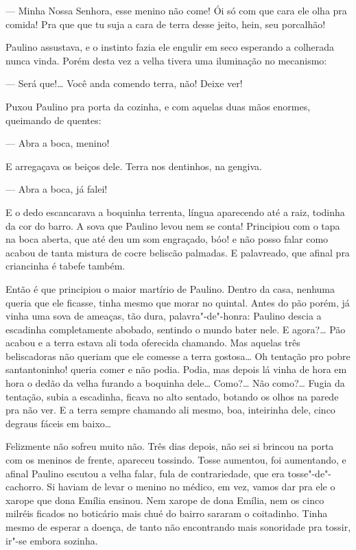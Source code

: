 --- Minha Nossa Senhora, esse menino não come! Ói só com que cara ele
olha pra comida! Pra que que tu suja a cara de terra desse jeito, hein,
seu porcalhão!

Paulino assustava, e o instinto fazia ele engulir em seco esperando a
colherada nunca vinda. Porém desta vez a velha tivera uma iluminação no
mecanismo:

--- Será que!\ldots{} Você anda comendo terra, não! Deixe ver!

Puxou Paulino pra porta da cozinha, e com aquelas duas mãos enormes,
queimando de quentes:

--- Abra a boca, menino!

E arregaçava os beiços dele. Terra nos dentinhos, na gengiva.

--- Abra a boca, já falei!

E o dedo escancarava a boquinha terrenta, língua aparecendo até a raiz,
todinha da cor do barro. A sova que Paulino levou nem se conta!
Principiou com o tapa na boca aberta, que até deu um som engraçado, bóo!
e não posso falar como acabou de tanta mistura de cocre beliscão
palmadas. E palavreado, que afinal pra criancinha é tabefe também.

Então é que principiou o maior martírio de Paulino. Dentro da casa,
nenhuma queria que ele ficasse, tinha mesmo que morar no quintal. Antes
do pão porém, já vinha uma sova de ameaças, tão dura, palavra"-de"-honra:
Paulino descia a escadinha completamente abobado, sentindo o mundo bater
nele. E agora?\ldots{} Pão acabou e a terra estava ali toda oferecida
chamando. Mas aquelas três beliscadoras não queriam que ele comesse a
terra gostosa\ldots{} Oh tentação pro pobre santantoninho! queria comer e não
podia. Podia, mas depois lá vinha de hora em hora o dedão da velha
furando a boquinha dele\ldots{} Como?\ldots{} Não como?\ldots{} Fugia da tentação,
subia a escadinha, ficava no alto sentado, botando os olhos na parede
pra não ver. E a terra sempre chamando ali mesmo, boa, inteirinha dele,
cinco degraus fáceis em baixo\ldots{}

Felizmente não sofreu muito não. Três dias depois, não sei si brincou na
porta com os meninos de frente, apareceu tossindo. Tosse aumentou, foi
aumentando, e afinal Paulino escutou a velha falar, fula de
contrariedade, que era tosse"-de"-cachorro. Si haviam de levar o menino no
médico, em vez, vamos dar pra ele o xarope que dona Emília ensinou. Nem
xarope de dona Emília, nem os cinco milréis ficados no boticário mais
chué do bairro sararam o coitadinho. Tinha mesmo de esperar a doença, de
tanto não encontrando mais sonoridade pra tossir, ir"-se embora sozinha.

